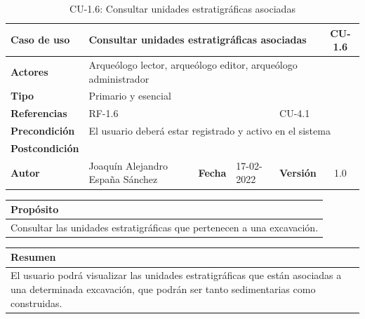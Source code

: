     \begin{table}[H]
    \begin{center}
        \begin{adjustbox}{width=\textwidth}
        \begin{tabular}{ | l | l | l | l | c | c | } 
            \hline
            \textbf{Caso de uso} & \multicolumn{4}{l|}{Consultar unidades estratigráficas asociadas} & \cellcolor{gray!50} \textbf{CU-1.6}\\
            \hline
            \textbf{Actores} & \multicolumn{5}{p{0.9\linewidth}|}{Arqueólogo lector, arqueólogo editor, arqueólogo administrador} \\
            \hline
            \textbf{Tipo} & \multicolumn{5}{l|}{Primario y esencial} \\
            \hline
            \textbf{Referencias} & \multicolumn{3}{l|}{RF-1.6} & \multicolumn{2}{l|}{CU-4.1}\\
            \hline
            \textbf{Precondición} & \multicolumn{5}{l|}{El usuario deberá estar registrado y activo en el sistema} \\
            \hline
            \textbf{Postcondición} & \multicolumn{5}{l|}{ } \\
            \hline
            \textbf{Autor} & \multicolumn{1}{p{0.25\linewidth}|}{Joaquín Alejandro España Sánchez} & \textbf{Fecha} & 
            17-02-2022     & \textbf{Versión}                                                      & 1.0\\
            \hline
        \end{tabular}
        \end{adjustbox}
        \caption{CU-1.6: Consultar unidades estratigráficas asociadas}
        \label{tab:consult-ues-excavation}
    \end{center}
    \end{table}

    \begin{table}[H]
        \centering
        \begin{tabularx}{\textwidth}{@{} |L |@{}} \hline
            \textbf{Propósito} \\
            \hline
            Consultar las unidades estratigráficas que pertenecen a una excavación. \\
            \hline
        \end{tabularx}
    \end{table}

    \begin{table}[H]
        \centering
        \begin{tabularx}{\textwidth}{@{} |L |@{}} \hline
            \textbf{Resumen} \\
            \hline
            El usuario podrá visualizar las unidades estratigráficas que están asociadas
            a una determinada excavación, que podrán ser tanto sedimentarias como
            construidas. \\
            \hline
        \end{tabularx}
    \end{table}

